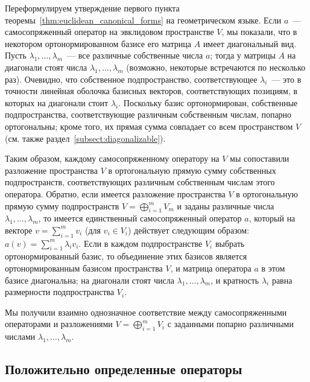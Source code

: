 \begin{remark}\label{rem:self_adjoint_geometry}
Переформулируем утверждение первого пункта
теоремы~\ref{thm:euclidean_canonical_forms} на геометрическом языке.
Если $a$~--- самосопряженный оператор на эвклидовом пространстве $V$,
мы показали, что в некотором ортонормированном базисе его матрица $A$
имеет диагональный вид. Пусть $\lambda_1,\dots,\lambda_m$~--- все
различные собственные числа $a$; тогда у матрицы $A$ на диагонали
стоят числа $\lambda_1,\dots,\lambda_m$ (возможно, некоторые
встречаются по несколько раз). Очевидно, что собственное
подпространство, соответствующее $\lambda_i$~--- это в точности
линейная оболочка базисных векторов, соответствующих позициям, в
которых на диагонали стоит $\lambda_i$. Поскольку базис
ортонормирован, собственные подпространства, соответствующие различным
собственным числам, попарно ортогональны; кроме того, их прямая сумма
совпадает со всем пространством $V$ (см. также
раздел~\ref{subsect:diagonalizable}).

Таким образом, каждому самосопряженному оператору на $V$ мы сопоставили
разложение пространства $V$ в ортогональную прямую сумму
собственных подпространств, соответствующих различным собственным
числам этого оператора.
Обратно, если имеется разложение пространства $V$ в ортогональную
прямую сумму подпространств $V=\bigoplus_{i=1}^{m}V_m$ и заданы
различные числа $\lambda_1,\dots,\lambda_m$, то имеется единственный
самосопряженный оператор $a$, который на векторе $v=\sum_{i=1}^m v_i$ (для
$v_i\in V_i$) действует следующим образом: $a(v) = \sum_{i=1}^m
\lambda_i v_i$. Если в каждом подпространстве $V_i$ выбрать
ортонормированный базис, то объединение этих базисов является
ортонормированным базисом пространства $V$, и матрица оператора $a$ в
этом базисе диагональна; на диагонали стоят числа
$\lambda_1,\dots,\lambda_m$, и кратность $\lambda_i$ равна размерности
подпространства $V_i$.

Мы получили взаимно однозначное соответствие между самосопряженными
операторами и разложениями $V=\bigoplus_{i=1}^m V_i$ с заданными
попарно различными числами $\lambda_1,\dots,\lambda_m$.
\end{remark}

\subsection{Положительно определенные операторы}


